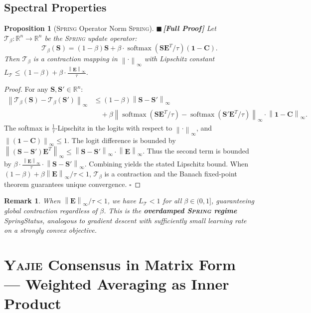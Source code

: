 \documentclass[12pt,a4paper]{article}
\newtheorem{proposition}[theorem]{Proposition}
\newtheorem{remark}[theorem]{Remark}
\theoremstyle{definition}
\newcommand{\rigorFull}{{\color{rigorcolor}$\blacksquare$\,\textbf{[Full Proof]}}}
\newcommand{\Yajie}{\textsc{Yajie}}
\newcommand{\Spring}{\textsc{Spring}}
\DeclareMathOperator{\softmax}{softmax}
\newcommand{\R}{\mathbb{R}}
\newcommand{\cT}{\mathcal{T}}
\newcommand{\norm}[1]{\left\lVert#1\right\rVert}
\newcommand{\ones}{\mathbf{1}}
\newcommand{\mat}[1]{\mathbf{#1}}
\begin{document}
\subsection{Spectral Properties }

\begin{proposition}[\Spring{} Operator Norm \Spring{}]\label{prop:spring_spectral}
\rigorFull
Let $\cT_\beta: \R^n \to \R^n$ be the \Spring{} update operator:
\[
\cT_\beta(\mat{S}) = (1-\beta)\mat{S} + \beta \cdot \softmax(\mat{S}\mat{E}^T/\tau)(\ones - \mat{C}).
\]
Then $\cT_\beta$ is a contraction mapping in $\norm{\cdot}_\infty$ with Lipschitz 
constant $L_{\cT} \leq (1-\beta) + \beta \cdot \frac{\norm{\mat{E}}_\infty}{\tau}$.
\end{proposition}

\begin{proof}
For any $\mat{S}, \mat{S}' \in \R^n$:
\begin{align*}
    \norm{\cT_\beta(\mat{S}) - \cT_\beta(\mat{S}')}_\infty 
    &\leq (1-\beta)\norm{\mat{S} - \mat{S}'}_\infty \\
    &\quad + \beta \norm{\softmax(\mat{S}\mat{E}^T/\tau) - \softmax(\mat{S}'\mat{E}^T/\tau)}_\infty \cdot \norm{\ones - \mat{C}}_\infty.
\end{align*}
The softmax is $\frac{1}{\tau}$-Lipschitz in the logits with respect to $\norm{\cdot}_\infty$,
and $\norm{(\ones - \mat{C})}_\infty \leq 1$. The logit difference is bounded by 
$\norm{(\mat{S} - \mat{S}')\mat{E}^T}_\infty \leq \norm{\mat{S} - \mat{S}'}_\infty \cdot \norm{\mat{E}}_\infty$.
Thus the second term is bounded by $\beta \cdot \frac{\norm{\mat{E}}_\infty}{\tau} \cdot \norm{\mat{S} - \mat{S}'}_\infty$.
Combining yields the stated Lipschitz bound. When $(1-\beta) + \beta \norm{\mat{E}}_\infty/\tau < 1$,
$\cT_\beta$ is a contraction and the Banach fixed-point theorem guarantees unique convergence. \hfill $\square$
\end{proof}

\begin{remark}
When $\norm{\mat{E}}_\infty/\tau < 1$, we have $L_{\cT} < 1$ for all $\beta \in (0,1]$,
guaranteeing global contraction regardless of $\beta$. This is the \textbf{overdamped 
\Spring{} regime} SpringStatus, analogous to gradient descent with sufficiently 
small learning rate on a strongly convex objective.
\end{remark}

\section{\Yajie{} Consensus in Matrix Form — Weighted Averaging as Inner Product }
\label{sec:yajie_matrix}
\end{document}
